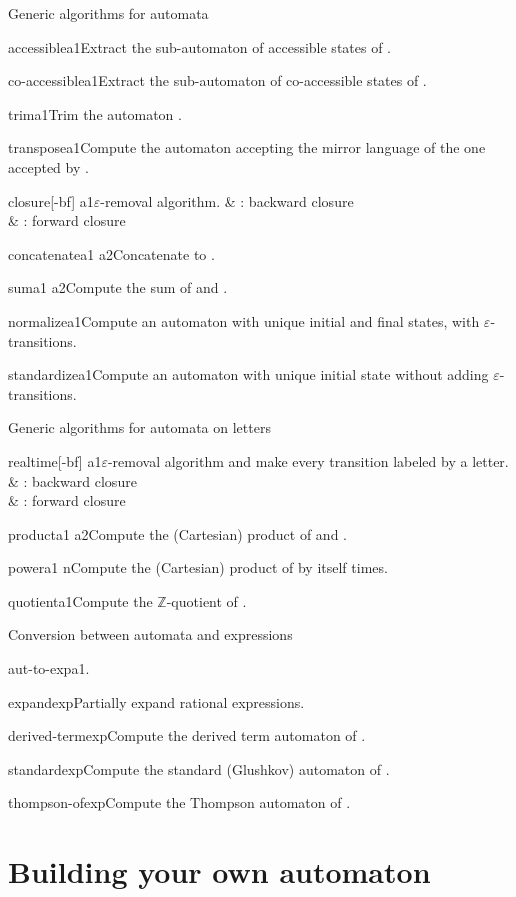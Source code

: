 \begin{fnsection}{Generic algorithms for automata}
\item{accessible}{a1}{Extract the sub-automaton of accessible states
    of .}
\item{co-accessible}{a1}{Extract the sub-automaton of co-accessible
    states of .}
\item{trim}{a1}{Trim the automaton .}
\item{transpose}{a1}{Compute the automaton accepting the mirror
    language of the one accepted by .}
\item{closure}{[-bf] a1}{$\varepsilon$-removal algorithm.}
  &  : backward closure\\
  &  : forward closure\\
\item{concatenate}{a1 a2}{Concatenate  to .}
\item{sum}{a1 a2}{Compute the sum of  and .}
\item{normalize}{a1}{Compute an automaton with unique initial and
    final states, with $\varepsilon$-transitions.}
\item{standardize}{a1}{Compute an automaton with unique initial state
    without adding $\varepsilon$-transitions.}  \hline
\end{fnsection}

\begin{fnsection}{Generic algorithms for automata on letters}
\item{realtime}{[-bf] a1}{$\varepsilon$-removal algorithm and make
    every transition labeled by a letter.}
  &  : backward closure\\
  &  : forward closure\\
\item{product}{a1 a2}{Compute the (Cartesian) product of  and
    .}
\item{power}{a1 n}{Compute the (Cartesian) product of  by
    itself  times.}
\item{quotient}{a1}{Compute the $\mathbb{Z}$-quotient of .}
  \hline
\end{fnsection}

\begin{fnsection}{Conversion between automata and expressions}
\item{aut-to-exp}{a1}{.}%
\item{expand}{exp}{Partially expand rational expressions.}
\item{derived-term}{exp}{Compute the derived term automaton of
    .}
\item{standard}{exp}{Compute the standard (Glushkov) automaton of
    .}
\item{thompson-of}{exp}{Compute the Thompson automaton of .}
  \hline
\end{fnsection}


\section{Building your own automaton}



